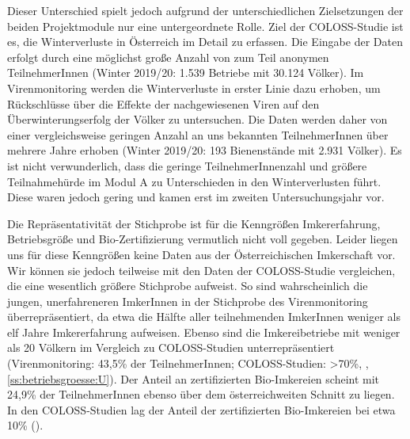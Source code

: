 Dieser Unterschied spielt jedoch aufgrund der unterschiedlichen Zielsetzungen der beiden Projektmodule nur eine untergeordnete Rolle. Ziel der COLOSS-Studie ist es, die Winterverluste in Österreich im Detail zu erfassen. Die Eingabe der Daten erfolgt durch eine möglichst große Anzahl von zum Teil anonymen TeilnehmerInnen (Winter 2019/20: 1.539 Betriebe mit 30.124 Völker). Im Virenmonitoring werden die Winterverluste in erster Linie dazu erhoben, um Rückschlüsse über die Effekte der nachgewiesenen Viren auf den Überwinterungserfolg der Völker zu untersuchen. Die Daten werden daher von einer vergleichsweise geringen Anzahl an uns bekannten TeilnehmerInnen über mehrere Jahre erhoben (Winter 2019/20: 193 Bienenstände mit 2.931 Völker). Es ist nicht verwunderlich, dass die geringe TeilnehmerInnenzahl und größere Teilnahmehürde im Modul A zu Unterschieden in den Winterverlusten führt. Diese waren jedoch gering und kamen erst im zweiten Untersuchungsjahr vor.

Die Repräsentativität der Stichprobe ist für die Kenngrößen Imkererfahrung, Betriebsgröße und Bio-Zertifizierung vermutlich nicht voll gegeben. Leider liegen uns für diese Kenngrößen keine Daten aus der Österreichischen Imkerschaft vor. Wir können sie jedoch teilweise mit den Daten der COLOSS-Studie vergleichen, die eine wesentlich größere Stichprobe aufweist. So sind wahrscheinlich die jungen, unerfahreneren ImkerInnen in der Stichprobe des Virenmonitoring überrepräsentiert, da etwa die Hälfte aller teilnehmenden ImkerInnen weniger als elf Jahre Imkererfahrung aufweisen. Ebenso sind die Imkereibetriebe mit weniger als 20 Völkern im Vergleich zu COLOSS-Studien unterrepräsentiert (Virenmonitoring: 43,5\% der TeilnehmerInnen; COLOSS-Studien: >70\%, \cite{brodschneider2018b, brodschneider2019b}, \cref{ss:betriebsgroesse:U}). Der Anteil an zertifizierten Bio-Imkereien scheint mit 24,9\% der TeilnehmerInnen ebenso über dem österreichweiten Schnitt zu liegen. In den COLOSS-Studien lag der Anteil der zertifizierten Bio-Imkereien bei etwa 10\% (\cite{brodschneider2018b, brodschneider2019b}).


